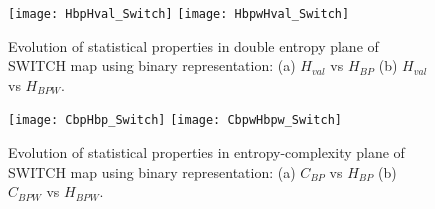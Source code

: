 \begin{figure}
	\texttt{[image: HbpHval\_Switch]}
	\texttt{[image: HbpwHval\_Switch]}
	\caption{Evolution of statistical properties in double entropy plane of SWITCH map using binary representation: (a) $H_{val}$ vs $H_{BP}$ (b) $H_{val}$ vs $H_{BPW}$.}
	\label{fig:SWITCH_HH}
\end{figure}

\begin{figure}
	\texttt{[image: CbpHbp\_Switch]}
	\texttt{[image: CbpwHbpw\_Switch]}
	\caption{Evolution of statistical properties in entropy-complexity plane of SWITCH map using binary representation: (a) $C_{BP}$ vs $H_{BP}$ (b) $C_{BPW}$ vs $H_{BPW}$.}
	\label{fig:SWITCH_HC}
\end{figure}